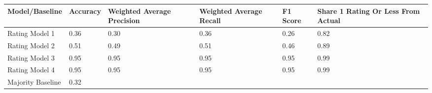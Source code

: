 \small
\begin{tabular}{x{0.75cm}|x{0.75cm}|x{0.75cm}|x{0.75cm}|x{0.75cm}|x{0.75cm}}
\toprule
Model/Baseline & Accuracy & Weighted Average Precision & Weighted Average Recall & F1 Score & Share 1 Rating Or Less From Actual \\
\midrule
Rating Model 1 & 0.36 & 0.30 & 0.36 & 0.26 & 0.82 \\
Rating Model 2 & 0.51 & 0.49 & 0.51 & 0.46 & 0.89 \\
Rating Model 3 & 0.95 & 0.95 & 0.95 & 0.95 & 0.99 \\
Rating Model 4 & 0.95 & 0.95 & 0.95 & 0.95 & 0.99 \\
Majority Baseline & 0.32 &  &  &  &  \\
\bottomrule
\end{tabular}

\normalsize